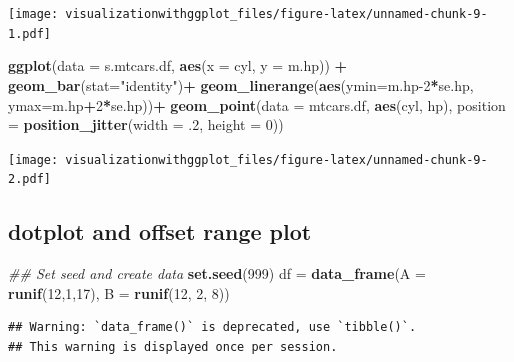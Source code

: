 \documentclass[]{krantz}
\makeatletter
\newenvironment{Shaded}{\begin{snugshade}}{\end{snugshade}}
\newcommand{\CommentTok}[1]{\textcolor[rgb]{0.56,0.35,0.01}{\textit{#1}}}
\newcommand{\DataTypeTok}[1]{\textcolor[rgb]{0.13,0.29,0.53}{#1}}
\newcommand{\DecValTok}[1]{\textcolor[rgb]{0.00,0.00,0.81}{#1}}
\newcommand{\FloatTok}[1]{\textcolor[rgb]{0.00,0.00,0.81}{#1}}
\newcommand{\KeywordTok}[1]{\textcolor[rgb]{0.13,0.29,0.53}{\textbf{#1}}}
\newcommand{\NormalTok}[1]{#1}
\newcommand{\OperatorTok}[1]{\textcolor[rgb]{0.81,0.36,0.00}{\textbf{#1}}}
\newcommand{\StringTok}[1]{\textcolor[rgb]{0.31,0.60,0.02}{#1}}
\newenvironment{kframe}{%
\medskip{}
\setlength{\fboxsep}{.8em}
 \def\at@end@of@kframe{}%
 \ifinner\ifhmode%
  \def\at@end@of@kframe{\end{minipage}}%
  \begin{minipage}{\columnwidth}%
 \fi\fi%
 \def\FrameCommand##1{\hskip\@totalleftmargin \hskip-\fboxsep
 \colorbox{shadecolor}{##1}\hskip-\fboxsep
     \hskip-\linewidth \hskip-\@totalleftmargin \hskip\columnwidth}%
 \MakeFramed {\advance\hsize-\width
   \@totalleftmargin\z@ \linewidth\hsize
   \@setminipage}}%
 {\par\unskip\endMakeFramed%
 \at@end@of@kframe}
\renewenvironment{Shaded}{\begin{kframe}}{\end{kframe}}
\makeatother
\begin{document}
\texttt{[image: visualizationwithggplot\_files/figure-latex/unnamed-chunk-9-1.pdf]}

\begin{Shaded}
\begin{Highlighting}[]
\KeywordTok{ggplot}\NormalTok{(}\DataTypeTok{data =}\NormalTok{ s.mtcars.df, }\KeywordTok{aes}\NormalTok{(}\DataTypeTok{x =}\NormalTok{ cyl, }\DataTypeTok{y =}\NormalTok{ m.hp)) }\OperatorTok{+}
\StringTok{  }\KeywordTok{geom_bar}\NormalTok{(}\DataTypeTok{stat=}\StringTok{"identity"}\NormalTok{)}\OperatorTok{+}
\StringTok{  }\KeywordTok{geom_linerange}\NormalTok{(}\KeywordTok{aes}\NormalTok{(}\DataTypeTok{ymin=}\NormalTok{m.hp}\DecValTok{-2}\OperatorTok{*}\NormalTok{se.hp, }\DataTypeTok{ymax=}\NormalTok{m.hp}\OperatorTok{+}\DecValTok{2}\OperatorTok{*}\NormalTok{se.hp))}\OperatorTok{+}
\StringTok{  }\KeywordTok{geom_point}\NormalTok{(}\DataTypeTok{data =}\NormalTok{ mtcars.df, }\KeywordTok{aes}\NormalTok{(cyl, hp), }\DataTypeTok{position =} \KeywordTok{position_jitter}\NormalTok{(}\DataTypeTok{width =} \FloatTok{.2}\NormalTok{, }\DataTypeTok{height =} \DecValTok{0}\NormalTok{))}
\end{Highlighting}
\end{Shaded}

\texttt{[image: visualizationwithggplot\_files/figure-latex/unnamed-chunk-9-2.pdf]}

\hypertarget{dotplot-and-offset-range-plot}{%
\subsection{dotplot and offset range plot}\label{dotplot-and-offset-range-plot}}

\begin{Shaded}
\begin{Highlighting}[]
\CommentTok{## Set seed and create data}
\KeywordTok{set.seed}\NormalTok{(}\DecValTok{999}\NormalTok{)}
\NormalTok{df =}\StringTok{ }\KeywordTok{data_frame}\NormalTok{(}\DataTypeTok{A =} \KeywordTok{runif}\NormalTok{(}\DecValTok{12}\NormalTok{,}\DecValTok{1}\NormalTok{,}\DecValTok{17}\NormalTok{), }\DataTypeTok{B =} \KeywordTok{runif}\NormalTok{(}\DecValTok{12}\NormalTok{, }\DecValTok{2}\NormalTok{, }\DecValTok{8}\NormalTok{))}
\end{Highlighting}
\end{Shaded}

\begin{verbatim}
## Warning: `data_frame()` is deprecated, use `tibble()`.
## This warning is displayed once per session.
\end{verbatim}
\end{document}
